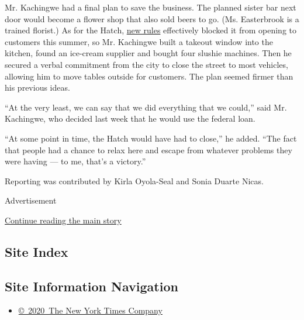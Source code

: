 Mr. Kachingwe had a final plan to save the business. The planned sister
bar next door would become a flower shop that also sold beers to go.
(Ms. Easterbrook is a trained florist.) As for the Hatch,
\href{https://covid19.ca.gov/pdf/guidance-restaurants-bars.pdf}{new
rules} effectively blocked it from opening to customers this summer, so
Mr. Kachingwe built a takeout window into the kitchen, found an
ice-cream supplier and bought four slushie machines. Then he secured a
verbal commitment from the city to close the street to most vehicles,
allowing him to move tables outside for customers. The plan seemed
firmer than his previous ideas.

``At the very least, we can say that we did everything that we could,''
said Mr. Kachingwe, who decided last week that he would use the federal
loan.

``At some point in time, the Hatch would have had to close,'' he added.
``The fact that people had a chance to relax here and escape from
whatever problems they were having --- to me, that's a victory.''

Reporting was contributed by Kirla Oyola-Seal and Sonia Duarte Nicas.

Advertisement

\protect\hyperlink{after-bottom}{Continue reading the main story}

\hypertarget{site-index}{%
\subsection{Site Index}\label{site-index}}

\hypertarget{site-information-navigation}{%
\subsection{Site Information
Navigation}\label{site-information-navigation}}

\begin{itemize}
\tightlist
\item
  \href{https://help.nytimes3xbfgragh.onion/hc/en-us/articles/115014792127-Copyright-notice}{©~2020~The
  New York Times Company}
\end{itemize}

